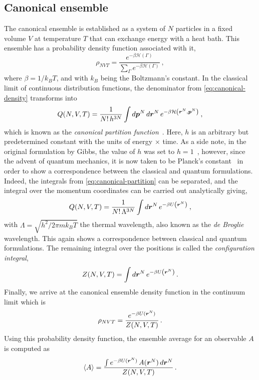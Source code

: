 \subsection{Canonical ensemble}
The canonical ensemble is established as a system of $N$ particles in a fixed volume $V$
at temperature $T$ that can exchange energy with a heat bath. This ensemble has a
probability density function associated with it,
\begin{equation}
    \rho_{NVT} = \frac{e^{-\beta \mathcal{H}(\Gamma)}}{\sum_{\Gamma} e^{-\beta \mathcal{H}(\Gamma)}}
    \: ,
    \label{eq:canonical-density}
\end{equation}
where $\beta=1/k_{B} T$, and with $k_{B}$ being the Boltzmann's constant. 
In the classical limit of continuous distribution functions, the denominator from 
\autoref{eq:canonical-density} transforms into
\begin{equation}
    Q(N,V,T) = \frac{1}{N! \, h^{3N}} \int d \bm{p}^{N} \, d \bm{r}^{N} \,
    e^{- \beta \mathcal{H} \left( \bm{r}^N, \bm{p}^N \right)}
    \: ,
    \label{eq:canonical-partition}
\end{equation}
which is known as the \emph{canonical partition function}~\cite{huangStatisticalMechanics1987}.
Here, $h$ is an arbitrary but predetermined constant with the units of energy $\times$
time. As a side note, in the original formulation by Gibbs, the value of $h$ was set
to $h=1$~\cite{gibbsElementaryPrinciplesStatistical2014}, however, since the advent
of quantum mechanics, it is now taken to be Planck's constant~\cite{tolmanPrinciplesStatisticalMechanics1979}
in order to show a correspondence between the classical and quantum formulations.
Indeed, the integrals from \autoref{eq:canonical-partition} can be separated, and the
integral over the momentum coordinates can be carried out analytically giving,
\begin{equation}
    Q(N,V,T) = \frac{1}{N! \, \Lambda^{3N}} \int d \bm{r}^{N} \,
    e^{- \beta U \left( \bm{r}^N \right)}
    \: ,
    \label{eq:canonical-partition-position}
\end{equation}
with $\Lambda=\sqrt{h^2 / 2 \pi m k_{B} T}$ the thermal wavelength, also known as the
\emph{de Broglie} wavelength. This again shows a correspondence between classical
and quantum formulations. The remaining integral over the positions is called the
\emph{configuration integral},
\begin{equation}
    Z(N,V,T) = \int d \bm{r}^{N} \, e^{- \beta U \left( \bm{r}^N \right)} \, .
    \label{eq:configuration-int}
\end{equation}
Finally, we arrive at the canonical ensemble density function in the continuum limit
which is
\begin{equation}
    \rho_{NVT} = \frac{e^{- \beta U(\bm{r}^{N})}}{Z(N,V,T)} \, .
    \label{eq:canonical-limit}
\end{equation}
Using this probability density function, the ensemble average for an observable $A$ is
computed as
\begin{equation}
    \left< A \right> = \frac{\int e^{- \beta U(\bm{r}^{N})} \, A(\bm{r}^{N}) \, d \bm{r}^{N}}{Z(N,V,T)} \, .
    \label{eq:average-canonical}
\end{equation}


